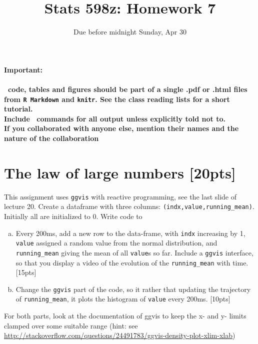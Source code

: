 \documentclass[10pt]{article}
\title{Stats 598z: Homework 7}
\author{Due before midnight Sunday, Apr 30}
\date{}
\begin{document}
\maketitle
\textbf{Important:\\~\\
  \R\ code, tables and figures should be part of a single .pdf or .html files from {\tt R Markdown} and {\tt knitr}. 
See the class reading lists for a short tutorial.\\
Include \R\ commands for all output unless explicitly told not to.\\
If you collaborated with anyone else, mention their names and the nature of the collaboration}



\section{The law of large numbers \hfill[20pts]}
This assignment uses \texttt{ggvis} with reactive programming, see
the last slide of lecture 20. Create a dataframe with three columns: 
    \texttt{(indx,value,running\_mean)}.
    Initially all are initialized to 0. Write code to 
\begin{enumerate}[(a)]
  \item 
      Every 200ms, add a new row to the data-frame, with
  \texttt{indx} increasing by 1, \texttt{value} assigned a random value from the
    normal distribution, and \texttt{running\_mean} giving the mean of all
    \texttt{value}s so far. 
  Include a \texttt{ggvis} interface,
    so that you display a video of the evolution of the \texttt{running\_mean}
    with time.     \hfill[15pts]
  \item Change the \texttt{ggvis} part of the code, so it rather that
    updating the trajectory of \texttt{running\_mean}, it plots the histogram
    of \texttt{value} every 200ms. \hfill[10pts]
\end{enumerate}
For both parts, look at the documentation of ggvis to keep the x- and y-
limits clamped over some suitable range (hint: see \url{http://stackoverflow.com/questions/24491783/ggvis-density-plot-xlim-xlab})
\end{document}
